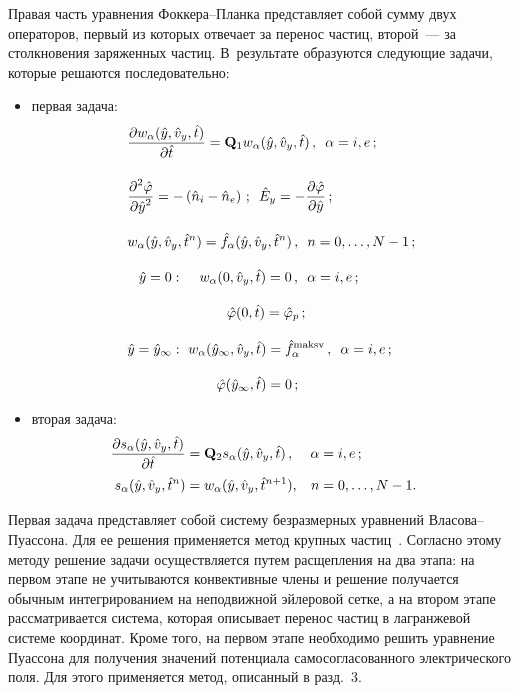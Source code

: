 \begin{multicols}{2}
      Правая часть уравнения Фок\-ке\-ра--План\-ка представляет собой сумму двух операторов, 
первый из которых отвечает за перенос частиц, второй~--- за столкновения заряженных частиц. 
В~результате образуются следующие задачи, которые решаются последовательно:
      \begin{itemize}
\item первая задача:
\begin{align*}
&\fr{\partial w_\alpha(\hat{y},\hat{v}_y,\hat{t})}{\partial\hat{t}} =\mathbf{Q}_1 
w_\alpha(\hat{y},\hat{v}_y,\hat{t})\,,\enskip \alpha=i,e\,;\\[9pt]
&\fr{\partial^2\hat\varphi}{\partial\hat{y}^2}=-\left(\hat{n}_i-\hat{n}_e\right)\,;\enskip
\hat{E}_y=-
\fr{\partial\hat\varphi}{\partial\hat{y}}\,;\\[9pt]
&w_\alpha(\hat{y},\hat{v}_y,\hat{t}^n)=\hat{f}_\alpha(\hat{y},\hat{v}_y,\hat{t}^n)\,,\enskip n=0,\ldots ,N-
1\,;\\[9pt]
&\hspace{2.9mm}\hat{y}=0:\ \hspace*{2.9mm}w_\alpha(0,\hat{v}_y,\hat{t})=0\,,\enskip \alpha=i,e\,;\\[9pt]
&\hspace*{25.1mm}\hat\varphi(0,\hat{t})=\hat{\varphi}_p\,;\\[9pt]
&\hat{y}=\hat{y}_\infty:\ w_\alpha(\hat{y}_\infty, \hat{v}_y, \hat{t})=
\hat{f}_\alpha^{\mathrm{maksv}}\,,\enskip 
\alpha=i,e\,;\\[9pt]
&\hspace*{22.5mm}\hat\varphi(\hat{y}_\infty,\hat{t})=0\,;
\end{align*}
\item вторая задача:
\begin{align*}
\!\!\!\!\!\!\!\fr{\partial s_\alpha(\hat{y},\hat{v}_y,\hat{t})}{\partial \hat{t}} &=\mathbf{Q}_2 
s_\alpha(\hat{y},\hat{v}_y,\hat{t})\,, & \alpha&=i,e\,;\\
\!\!\!\!\!\!\!s_\alpha (\hat{y},\hat{v}_y,\hat{t}^n) &=w_\alpha (\hat{y},\hat{v}_y, \hat{t}^{n+1}),& n&=0,\ldots ,N-
1.
\end{align*}
\end{itemize}

Первая задача представляет собой систему безразмерных уравнений Вла\-со\-ва--Пуас\-со\-на. Для ее 
решения применяется метод крупных частиц~\cite{18-k}. Согласно этому методу решение задачи 
осуществляется путем расщепления на два этапа: на первом этапе не учитываются конвективные члены 
и решение получается обычным интегрированием на неподвижной эйлеровой сетке, а на втором этапе 
рассматривается система, которая описывает перенос частиц в лагранжевой системе координат. Кроме 
того, на первом этапе необходимо решить уравнение Пуассона для получения значений потенциала 
самосогласованного электрического поля. Для этого применяется метод, описанный в разд.~3. 


\end{multicols}
